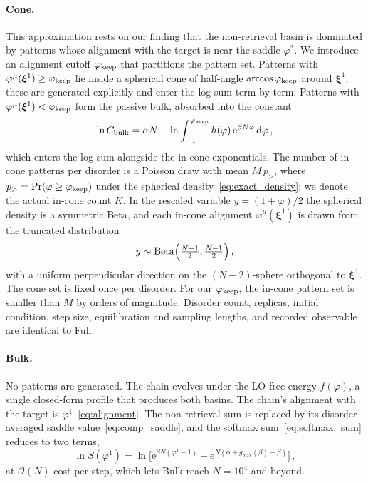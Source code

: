 \documentclass[letterpaper]{article} %
\newcommand{\bxi}{\boldsymbol{\xi}}
\newcommand{\e}{{\mathrm{e}}}
\newcommand{\dd}{{\mathrm{d}}}
\newcommand{\Bnet}{\beta}
\newcommand{\gmax}{g_{\max}}
\begin{document}
\paragraph{Cone.}
This approximation rests on our finding that the non-retrieval basin is dominated by patterns whose alignment with the target is near the saddle $\varphi^*$. We introduce an alignment cutoff $\varphi_{\rm keep}$ that partitions the pattern set. Patterns with $\varphi^\mu(\bxi^1) \geq \varphi_{\rm keep}$ lie inside a spherical cone of half-angle $\arccos \varphi_{\rm keep}$ around $\bxi^1$; these are generated explicitly and enter the log-sum term-by-term. Patterns with $\varphi^\mu(\bxi^1) < \varphi_{\rm keep}$ form the passive bulk, absorbed into the constant
\begin{equation}
    \ln C_{\rm bulk} = \alpha N + \ln\int_{-1}^{\varphi_{\rm keep}} h(\varphi)\,\e^{\Bnet N \varphi}\,\dd\varphi\,,
    \label{eq:cbulk}
\end{equation}
which enters the log-sum alongside the in-cone exponentials. The number of in-cone patterns per disorder is a Poisson draw with mean $M\,p_{>}$, where $p_{>} = \Pr(\varphi \geq \varphi_{\rm keep})$ under the spherical density~\eqref{eq:exact_density}; we denote the actual in-cone count $K$. In the rescaled variable $y = (1 + \varphi)/2$ the spherical density is a symmetric Beta, and each in-cone alignment $\varphi^\mu(\bxi^1)$ is drawn from the truncated distribution
\begin{equation}
    y \sim \mathrm{Beta} \Bigl(\tfrac{N-1}{2}, \tfrac{N-1}{2}\Bigr)\,,
    \label{eq:beta-tail}
\end{equation}
with a uniform perpendicular direction on the $(N{-}2)$-sphere orthogonal to $\bxi^1$. The cone set is fixed once per disorder. For our $\varphi_{\rm keep}$, the in-cone pattern set is smaller than $M$ by orders of magnitude. Disorder count, replicas, initial condition, step size, equilibration and sampling lengths, and recorded observable are identical to Full. 

\paragraph{Bulk.}
No patterns are generated. The chain evolves under the LO free energy $f(\varphi)$, a single closed-form profile that produces both basins. The chain's alignment with the target is $\varphi^1$~\eqref{eq:alignment}. The non-retrieval sum is replaced by its disorder-averaged saddle value~\eqref{eq:comp_saddle}, and the softmax sum~\eqref{eq:softmax_sum} reduces to two terms,
\begin{equation}
	\ln S(\varphi^1) = \ln \bigl[\e^{\Bnet N(\varphi^1 - 1)} + \e^{N(\alpha + \gmax(\Bnet) - \Bnet)}\bigr]\,,
	\label{eq:bulk-logS}
\end{equation}
at $\mathcal{O}(N)$ cost per step, which lets Bulk reach $N = 10^4$ and beyond.
\end{document}
